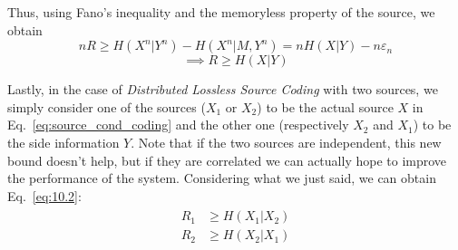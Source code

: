 Thus, using Fano's inequality and the memoryless property of the source, we obtain
%
\begin{equation}
nR \geq H(X^n|Y^n) - H(X^n|M,Y^n) = nH(X|Y) - n\varepsilon_n
\end{equation}
\begin{equation} \label{eq:source_cond_coding}
\implies R \geq H(X|Y)
\end{equation}

Lastly, in the case of \textit{Distributed Lossless Source Coding} with two sources, we simply consider one of the sources ($X_1$ or $X_2$) to be the actual source $X$ in Eq.~\eqref{eq:source_cond_coding} and the other one (respectively $X_2$ and $X_1$) to be the side information $Y$. Note that if the two sources are independent, this new bound doesn't help, but if they are correlated we can actually hope to improve the performance of the system. Considering what we just said, we can obtain Eq.~\eqref{eq:10.2}:
%
\begin{align}
\begin{split}
R_1 &\geq H(X_1|X_2)\\
R_2 &\geq H(X_2|X_1)
\end{split}
\tag{10.2}
\label{eq:10.2}
\end{align}